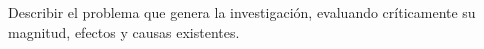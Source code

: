 Describir el problema que genera la investigación, evaluando críticamente su magnitud, efectos y causas existentes.

